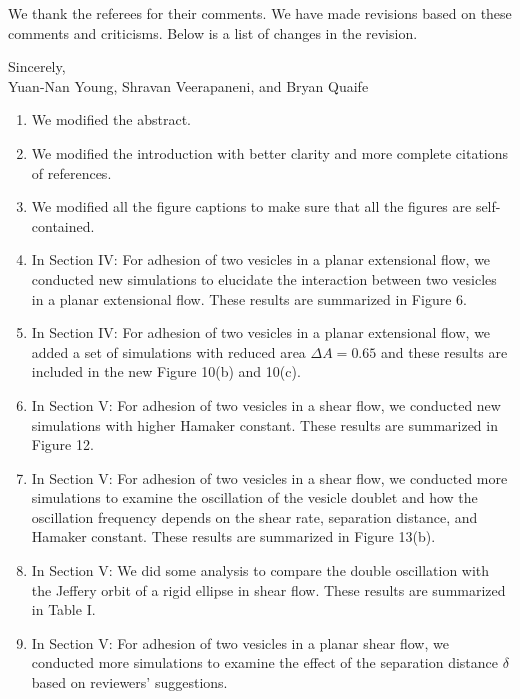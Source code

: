 \documentclass[11pt]{article}
\begin{document}
\noindent
We thank the referees for their comments.   We have made revisions based on these comments and criticisms.
Below is a list of changes in the revision.

\medskip \noindent 
Sincerely, \\ \noindent
Yuan-Nan Young, Shravan Veerapaneni, and Bryan Quaife

\vspace{20pt}

\begin{enumerate}

\item We modified the abstract.

\item We modified the introduction with better clarity and more complete
  citations of references.

\item We modified all the figure captions to make sure that all the
  figures are self-contained.

\item In Section IV: For adhesion of two vesicles in a planar extensional
  flow, we conducted new simulations to elucidate the interaction
    between two vesicles in a planar extensional flow. These results are
    summarized in Figure 6.

\item In Section IV: For adhesion of two vesicles in a planar extensional
  flow, we added a set of simulations with reduced area $\Delta A=0.65$
    and these results are included in the new Figure 10(b) and 10(c).

\item In Section V: For adhesion of two vesicles in a shear flow, we
  conducted new simulations with higher Hamaker constant. These results
    are summarized in Figure 12.

\item In Section V: For adhesion of two vesicles in a shear flow, we
  conducted more simulations to examine the oscillation of the vesicle
    doublet and how the oscillation frequency depends on the shear rate,
    separation distance, and Hamaker constant. These results are
    summarized in Figure 13(b). 
    
\item In Section V: We did some analysis to compare the double
  oscillation with the Jeffery orbit of a rigid ellipse in shear flow.
    These results are summarized in Table I.

\item In Section V: For adhesion of two vesicles in a planar shear flow,
  we conducted more simulations to examine the effect of the separation
    distance $\delta$ based on reviewers' suggestions.


\end{enumerate}
\end{document}
